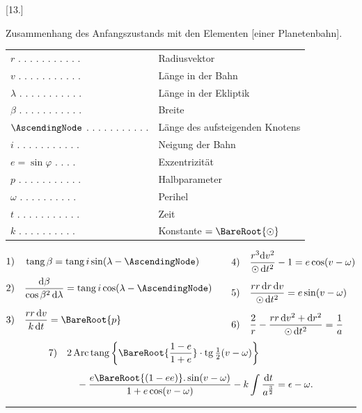 \begin{center}
[13.]
\end{center}
\begin{center}
Zusammenhang des Anfangszustands mit den Elementen [einer Planetenbahn].
\end{center}
\begin{center}
\begin{tabular}{@{}ll@{}}
\(r\) . . . . . . . . . . . & Radiusvektor\\
\(v\) . . . . . . . . . . . & Länge in der Bahn\\
\(\lambda\) . . . . . . . . . . . & Länge in der Ekliptik\\
\(\beta\) . . . . . . . . . . . & Breite\\
\(\AscendingNode\) . . . . . . . . . . . & Länge des aufsteigenden Knotens\\
\(i\) . . . . . . . . . . . & Neigung der Bahn\\
\(e=\sin\varphi\) . . . . & Exzentrizität\\
\(p\) . . . . . . . . . . . & Halbparameter\\
\(\omega\) . . . . . . . . . . & Perihel\\
\(t\) . . . . . . . . . . . & Zeit\\
\(k\) . . . . . . . . . . & Konstante \(=\BareRoot{\odot}\)
\end{tabular}
\end{center}
\[
\begin{aligned}
1)\quad&\operatorname{tang}\beta=\operatorname{tang}i\sin(\lambda-\AscendingNode)\\[6pt]
2)\quad&\frac{\mathrm{d}\beta}{\cos\beta^2\,\mathrm{d}\lambda}=\operatorname{tang}i\cos(\lambda-\AscendingNode)\\[6pt]
3)\quad&\frac{rr\,\mathrm{d}v}{k\,\mathrm{d}t}=\BareRoot{p}
\end{aligned}\qquad\begin{aligned}
4)\quad&\frac{r^3\mathrm{d}v^2}{\odot\,\mathrm{d}t^2}-1=e\cos(v-\omega)\\[6pt]
5)\quad&\frac{rr\,\mathrm{d}r\,\mathrm{d}v}{\odot\,\mathrm{d}t^2}=e\sin(v-\omega)\\[6pt]
6)\quad&\frac{2}{r}-\frac{rr\,\mathrm{d}v^2+\mathrm{d}r^2}{\odot\,\mathrm{d}t^2}=\frac{1}{a}
\end{aligned}
\]
\[
\begin{aligned}
7)\quad&2\operatorname{Arc\,tang}\left\{\BareRoot{\frac{1-e}{1+e}}\cdot\operatorname{tg}\tfrac12(v-\omega)\right\}\\[5pt]
&\quad-\frac{e\BareRoot{(1-ee)}\mathord{.}\sin(v-\omega)}{1+e\cos(v-\omega)}-k\int\frac{\mathrm{d}t}{a^{\frac32}}=\epsilon-\omega.
\end{aligned}
\]
\begin{center}\rule{.18\textwidth}{.35pt}\end{center}
